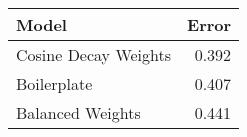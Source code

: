 \begin{tabular}{lr}
\toprule
               Model &  Error \\
\midrule
Cosine Decay Weights &  0.392 \\
         Boilerplate &  0.407 \\
    Balanced Weights &  0.441 \\
\bottomrule
\end{tabular}
